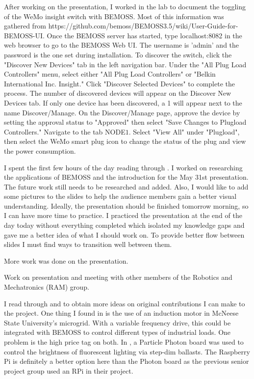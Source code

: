 \documentclass[fontsize=11pt, %
                             paper=letter, %
                             twoside, %
                             captions=tableheading,
                             index=totoc,
                             hyperref]{labbook}
\begin{document}
\begin{addmargin}[0cm]{0cm}
After working on the presentation, I worked in the lab to document the toggling of
the WeMo insight switch with BEMOSS. Most of this information was gathered from
https://github.com/bemoss/BEMOSS3.5/wiki/User-Guide-for-BEMOSS-UI.
Once the BEMOSS server has started, type localhost:8082 in the web browser to go to
the BEMOSS Web UI. The username is ’admin’ and the password is the one set during
installation. To discover the switch, click the "Discover New Devices" tab in the left
navigation bar. Under the "All Plug Load Controllers" menu, select either "All Plug Load
Controllers" or "Belkin International Inc. Insight." Click "Discover Selected Devices" to
complete the process. The number of discovered devices will appear on the Discover
New Devices tab. If only one device has been discovered, a 1 will appear next to the
name Discover/Manage. On the Discover/Manage page, approve the device by setting the
approval status to "Approved" then select "Save Changes to Plugload Controllers." Navigate to the tab NODE$1$. Select "View All" under "Plugload", then select the WeMo smart plug icon to change the status of the plug and view the power consumption.  

I spent the first few hours of the day reading through \cite{Pipattanasomporn2015}. I worked on researching the applications of BEMOSS and the introduction for the May 31st presentation. The future work still needs to be researched and added. Also, I would like to add some pictures to the slides to help the audience members gain a better visual understanding. Ideally, the presentation should be finished tomorrow morning, so I can have more time to practice. I practiced the presentation at the end of the day today without everything completed which isolated my knowledge gaps and gave me a better idea of what I should work on. To provide better flow between slides I must find ways to transition well between them. 

More work was done on the presentation.

Work on presentation and meeting with other members of the Robotics and Mechatronics (RAM) group.

I read through \cite{Zhang2016} and \cite{Khan2018} to obtain more ideas on original contributions I can make to the project. One thing I found in \cite{Khan2018} is the use of an induction motor in McNeese State University's microgrid. With a variable frequency drive, this could be integrated with BEMOSS to control different types of industrial loads. One problem is the high price tag on both. In \cite{Zhang2016}, a Particle Photon board was used to control the brightness of fluorescent lighting via step-dim ballasts. The Raspberry Pi is definitely a better option here than the Photon board as the previous senior project group used an RPi in their project. 


\end{addmargin}
\end{document}
